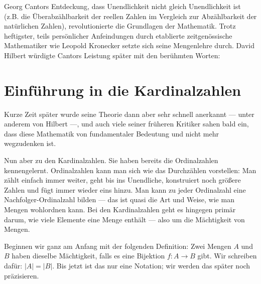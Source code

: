 \begin{didactic-insight}
Georg Cantors Entdeckung, dass Unendlichkeit nicht gleich Unendlichkeit ist (z.B. die Überabzählbarkeit der reellen Zahlen im Vergleich zur Abzählbarkeit der natürlichen Zahlen), revolutionierte die Grundlagen der Mathematik. Trotz heftigster, teils persönlicher Anfeindungen durch etablierte zeitgenössische Mathematiker wie Leopold Kronecker setzte sich seine Mengenlehre durch. David Hilbert würdigte Cantors Leistung später mit den berühmten Worten: 
\end{didactic-insight}

\section{Einführung in die Kardinalzahlen}

\begin{spoken-clean}[00:15:23 - 00:17:00]
Kurze Zeit später wurde seine Theorie dann aber sehr schnell anerkannt --- unter anderem von Hilbert ---, und auch viele seiner früheren Kritiker sahen bald ein, dass diese Mathematik von fundamentaler Bedeutung und nicht mehr wegzudenken ist.

Nun aber zu den Kardinalzahlen. Sie haben bereits die Ordinalzahlen kennengelernt. Ordinalzahlen kann man sich wie das Durchzählen vorstellen: Man zählt einfach immer weiter, geht bis ins Unendliche, konstruiert noch größere Zahlen und fügt immer wieder eins hinzu. Man kann zu jeder Ordinalzahl eine Nachfolger-Ordinalzahl bilden --- das ist quasi die Art und Weise, wie man Mengen wohlordnen kann. Bei den Kardinalzahlen geht es hingegen primär darum, wie viele Elemente eine Menge enthält --- also um die Mächtigkeit von Mengen.

Beginnen wir ganz am Anfang mit der folgenden Definition: Zwei Mengen $A$ und $B$ haben dieselbe Mächtigkeit, falls es eine Bijektion $f \colon A \to B$ gibt. Wir schreiben dafür: $|A| = |B|$. Bis jetzt ist das nur eine Notation; wir werden das später noch präzisieren.
\end{spoken-clean}

